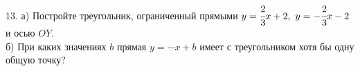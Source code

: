 13. а) Постройте треугольник, ограниченный прямыми $y=\cfrac{2}{3}x+2,\ y=-\cfrac{2}{3}x-2$ и осью $OY.$\\
б) При каких значениях $b$ прямая $y=-x+b$ имеет с треугольником хотя бы одну общую точку?\\
